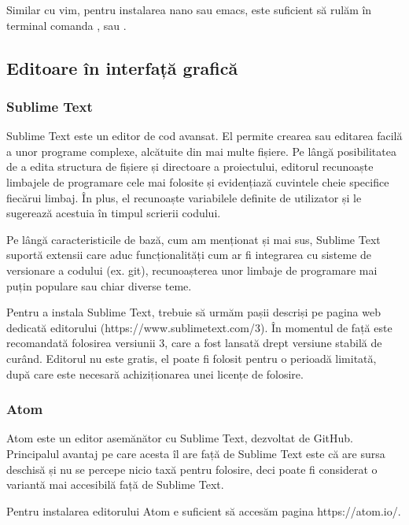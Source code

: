 Similar cu vim, pentru instalarea nano sau emacs, este suficient să rulăm în
terminal comanda ,  sau
.

\subsection{Editoare în interfață grafică}
\label{sec:appdev-graphicedit}

\subsubsection{Sublime Text}
\label{sec:appdev-graphicedit-sublime}

Sublime Text este un editor de cod avansat. El permite crearea sau editarea
facilă a unor programe complexe, alcătuite din mai multe fișiere. Pe lângă
posibilitatea de a edita structura de fișiere și directoare a proiectului,
editorul recunoaște limbajele de programare cele mai folosite și evidențiază
cuvintele cheie specifice fiecărui limbaj. În plus, el recunoaște variabilele
definite de utilizator și le sugerează acestuia în timpul scrierii codului.

Pe lângă caracteristicile de bază, cum am menționat și mai sus, Sublime Text
suportă extensii care aduc funcționalități cum ar fi integrarea cu sisteme de
versionare a codului (ex. git), recunoașterea unor limbaje de programare mai
puțin populare sau chiar diverse teme.

Pentru a instala Sublime Text, trebuie să urmăm pașii descriși pe pagina web
dedicată editorului (https://www.sublimetext.com/3). În momentul de față este
recomandată folosirea versiunii 3, care a fost lansată drept versiune stabilă de
curând. Editorul nu este gratis, el poate fi folosit pentru o perioadă limitată,
după care este necesară achiziționarea unei licențe de folosire.

\subsubsection{Atom}
\label{sec:appdev-graphicedit-atom}

Atom este un editor asemănător cu Sublime Text, dezvoltat de GitHub. Principalul
avantaj pe care acesta îl are față de Sublime Text este că are sursa deschisă și
nu se percepe nicio taxă pentru folosire, deci poate fi considerat o variantă
mai accesibilă față de Sublime Text.

Pentru instalarea editorului Atom e suficient să accesăm pagina
https://atom.io/.

